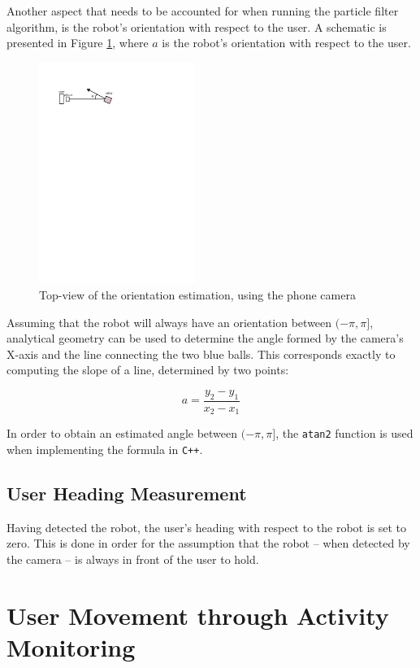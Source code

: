 \documentclass[journal]{IEEEtran}
\let\MYoriglatexcaption\caption
\renewcommand{\caption}[2][\relax]{\MYoriglatexcaption[#2]{#2}}
\begin{document}
Another aspect that needs to be accounted for when running the particle filter algorithm, is the robot's orientation with respect to the user. A schematic is presented in Figure \ref{fig:orient_camera}, where $a$ is the robot's orientation with respect to the user.
%
\begin{figure}[htpb]
 \centering
\includegraphics[width=2in]{images/orientation_meas}
\caption{Top-view of the orientation estimation, using the phone camera}
\label{fig:orient_camera}
\end{figure}
%
Assuming that the robot will always have an orientation between $(-\pi, \pi]$, analytical geometry can be used to determine the angle formed by the camera's X-axis and the line connecting the two blue balls. This corresponds exactly to computing the slope of a line, determined by two points:

\begin{equation}
a=\frac{y_2-y_1}{x_2-x_1}
\end{equation}

In order to obtain an estimated angle between $(-\pi, \pi]$, the \texttt{atan2} function is used when implementing the formula in \texttt{C++}.

\subsection{User Heading Measurement}
Having detected the robot, the user's heading with respect to the robot is set to zero. This is done in order for the assumption that the robot -- when detected by the camera -- is always in front of the user to hold.

\section{User Movement through Activity Monitoring}
\end{document}
